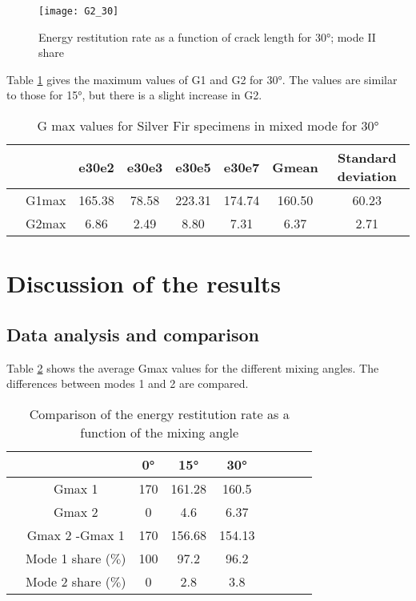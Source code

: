 \begin{figure}[htp]
	\centering
	\texttt{[image: G2\_30]}
	\caption{Energy restitution rate as a function of crack length for 30°; mode II share}
	\label{fig:G2_30}
\end{figure}

Table \ref{fig:tableG30} gives the maximum values of G1 and G2 for 30°. The values are similar to those for 15°, but there is a slight increase in G2.

\begin{table} [H]
	\centering
	\begin{tabular}{cccccccc}
		\toprule %
		&  & e30e2 & e30e3 & e30e5 & e30e7 & Gmean & Standard deviation\\\midrule
		& G1max & 165.38 & 78.58 & 223.31 & 174.74 & 160.50 & 60.23 \\\midrule
		& G2max & 6.86 & 2.49 & 8.80 & 7.31 & 6.37 & 2.71\\\midrule
	\end{tabular}
	\caption{G max values for Silver Fir specimens in mixed mode for 30°}
	\label{fig:tableG30}
\end{table}

\section{Discussion of the results}

\subsection{Data analysis and comparison}

Table \ref{fig:Comparison_angle} shows the average Gmax values for the different mixing angles. The differences between modes 1 and 2 are compared.

\begin{table} [H]
	\centering
	\begin{tabular}{ccccccccc}
		\toprule %
		&  & 0° & 15° & 30° \\\midrule
		& Gmax 1 & 170 & 161.28 & 160.5  \\\midrule
		& Gmax 2 & 0 & 4.6 & 6.37 \\\midrule
		& Gmax 2 -Gmax 1 & 170 & 156.68 & 154.13 \\\midrule
		& Mode 1 share ($\%$) & 100 & 97.2 & 96.2 \\\midrule
		& Mode 2 share ($\%$) & 0 & 2.8 & 3.8 \\\midrule
	\end{tabular}
	\caption{Comparison of the energy restitution rate as a function of the mixing angle}
	\label{fig:Comparison_angle}
\end{table}

